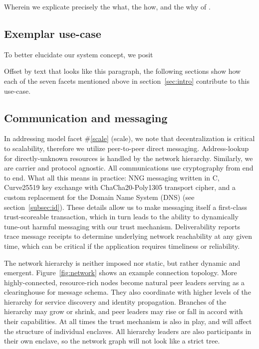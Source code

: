 Wherein we explicate precisely the what, the how, and the why of \projectName.

\subsection{Exemplar use-case}\label{subsec:use}

To better elucidate our system concept, we posit 

\begin{ppl}
Offset by text that looks like this paragraph, the following sections show how each of the seven facets mentioned above in section~\ref{sec:intro} contribute to this use-case.

\end{ppl}

\subsection{Communication and messaging}\label{subsec:comms}

In addressing model facet \#\ref{scale} (scale), we note that decentralization is critical to scalability, therefore we utilize peer-to-peer direct messaging.
Address-lookup for directly-unknown resources is handled by the network hierarchy.
Similarly, we are carrier and protocol agnostic.
All communications use cryptography from end to end.  %
What all this means in practice: NNG messaging written in C, Curve25519 key exchange with ChaCha20-Poly1305 transport cipher, and a custom replacement for the Domain Name System (DNS) (see section~\ref{subsec:id}).
These details allow us to make messaging itself a first-class trust-scoreable transaction, which in turn leads to the ability to dynamically tune-out harmful messaging with our trust mechanism.
Deliverability reports trace message receipts to determine underlying network reachability at any given time, which can be critical if the application requires timeliness or reliability.

The network hierarchy is neither imposed nor static, but rather dynamic and emergent.
Figure~\ref{fig:network} shows an example connection topology.
More highly-connected, resource-rich nodes become natural peer leaders serving as a clearinghouse for message schema.
They also coordinate with higher levels of the hierarchy for service discovery and identity propagation.
Branches of the hierarchy may grow or shrink, and peer leaders may rise or fall in accord with their capabilities.
At all times the trust mechanism is also in play, and will affect the structure of individual enclaves.
All hierarchy leaders are also participants in their own enclave, so the network graph will not look like a strict tree.

